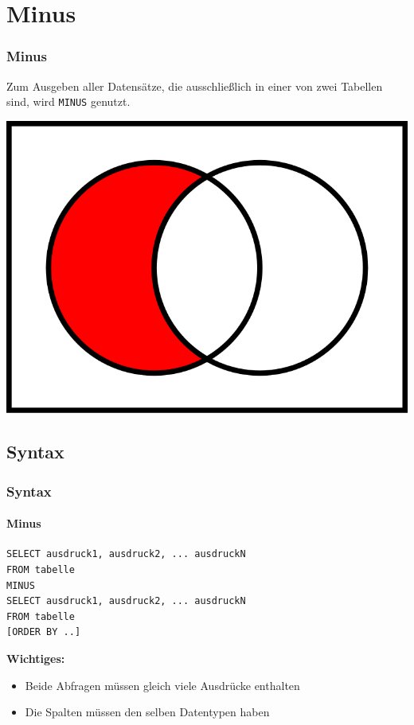 \documentclass[10pt,a4paper]{beamer}
\begin{document}
\section{Minus}
\begin{frame}
\frametitle{Minus}
Zum Ausgeben aller Datensätze, die ausschließlich in einer von zwei Tabellen sind, wird \lstinline|MINUS| genutzt. 
\begin{center}
\includegraphics[width=0.5\linewidth]{differenzmenge}
\end{center}
\end{frame}

\subsection{Syntax}
\begin{frame}[fragile]
\frametitle{Syntax}
\framesubtitle{Minus}
\begin{lstlisting}
SELECT ausdruck1, ausdruck2, ... ausdruckN
FROM tabelle
MINUS
SELECT ausdruck1, ausdruck2, ... ausdruckN
FROM tabelle
[ORDER BY ..]
\end{lstlisting}
\textbf{Wichtiges:}
\begin{itemize}
\item Beide Abfragen müssen gleich viele Ausdrücke enthalten
\item Die Spalten müssen den selben Datentypen haben 
\end{itemize}
\end{frame}
\end{document}
